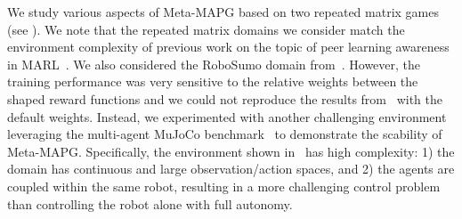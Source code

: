 \noindent{} 
We study various aspects of Meta-MAPG based on two repeated matrix games (see ). 
We note that the repeated matrix domains we consider match the environment complexity of previous work on the topic of peer learning awareness in MARL~\citep{foerster17lola,foerster2018dice,letcher2018stable}.
We also considered the RoboSumo domain from~\citet{alshedivat2018continuous}. 
However, the training performance was very sensitive to the relative weights between the shaped reward functions and we could not reproduce the results from~\citet{alshedivat2018continuous} with the default weights.
Instead, we experimented with another challenging environment leveraging the multi-agent MuJoCo benchmark~\citep{dewitt2020deep_multimujoco} to demonstrate the scability of Meta-MAPG.
Specifically, the environment shown in~ has high complexity: 1) the domain has continuous and large observation/action spaces, and 2) the agents are coupled within the same robot, resulting in a more challenging control problem than controlling the robot alone with full autonomy.
